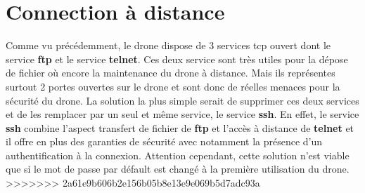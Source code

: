 \section{Connection à distance}
Comme vu précédemment, le drone dispose de 3 services tcp ouvert dont le service \textbf{ftp} et le service \textbf{telnet}. Ces deux service sont très utiles pour la dépose de fichier où encore la maintenance du drone à distance. Mais ils représentes surtout 2 portes ouvertes sur le drone et sont donc de réelles menaces pour la sécurité du drone.
La solution la plus simple serait de supprimer ces deux services et de les remplacer par un seul et même service, le service \textbf{ssh}. En effet, le service \textbf{ssh} combine l'aspect transfert de fichier de \textbf{ftp} et l'accès à distance de \textbf{telnet} et il offre en plus des garanties de sécurité avec notamment la présence d'un authentification à la connexion. Attention cependant, cette solution n'est viable que si le mot de passe par défault est changé à la première utilisation du drone. 
>>>>>>> 2a61e9b606b2e156b05b8e13e9e069b5d7adc93a
